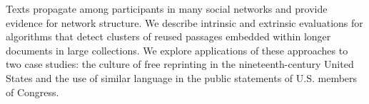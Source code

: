 Texts propagate among participants in many social networks and provide evidence for network structure. We describe intrinsic and extrinsic evaluations for algorithms that detect clusters of reused passages embedded within longer documents in large collections. We explore applications of these approaches to two case studies: the culture of free reprinting in the nineteenth-century United States and the use of similar language in the public statements of U.S. members of Congress.
